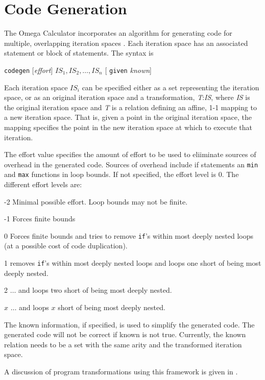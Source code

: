 \section{Code Generation}
\label{section:codegen}
The Omega Calculator incorporates an algorithm for generating code for
multiple, overlapping iteration spaces \cite{Uniform4}.  Each
iteration space has an associated statement or block of statements.
The syntax is 
\centerline{{\tt codegen} [{\em effort}] $IS_1, IS_2, \ldots ,IS_n$ [ {\tt given} {\em known}] }
Each
iteration space $IS_i$ can be specified either as a set representing
the iteration space, or as an original iteration space and a
transformation, {\em T}:{\em IS}, where {\em IS} is the original
iteration space and {\em T} is a relation defining an affine, 1-1 mapping
to a new iteration space. That is, given a point in the original
iteration space, the mapping specifies the point in the new iteration
space at which to execute that iteration.

The effort value specifies the amount of effort to be used to
eliiminate sources of overhead in the generated code. Sources of
overhead include if statements an {\tt min} and {\tt max} functions
in loop bounds. If not specified, the effort level is 0. The different effort
levels are:
\begin{description}
\item{-2}	Minimal possible effort. Loop bounds may not be finite.
\item{-1}	Forces finite bounds
\item{0}	Forces finite bounds and tries to remove {\tt if}'s 
		within most deeply nested loops (at a possible cost
		of code duplication).
\item{1}	removes {\tt if}'s within most deeply nested loops
		and loops one short of being most deeply nested.
\item{2}	$\ldots$ and loops two short of being most deeply nested.
\item{$x$}	$\ldots$ and loops $x$ short of being most deeply nested.
\end{description}

The known information, if specified, is used to simplify the generated
code. The generated code will not be correct if known is not true.
Currently, the known relation needs to be a set with the same arity and the transformed
iteration space.

A discussion of program transformations using this framework is
given in \cite{Uniform2.1,Uniform2.3,Uniform3}.

